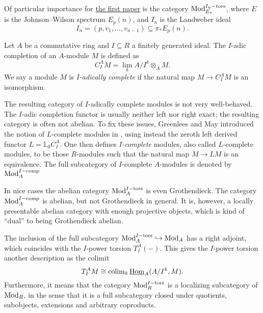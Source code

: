 \begin{example}
    Of particular importance for \hyperref[ch1]{the first paper} is the category $\mathrm{Mod}_{E_*}^{I_n-\mathrm{tors}}$, where $E$ is the Johnson--Wilson spectrum $E_p(n)$, and $I_n$ is the Landweber ideal 
    \[I_n = (p, v_1, \ldots, v_{n-1})\subseteq \pi_* E_p(n).\]
\end{example}

\begin{definition}
    Let $A$ be a commutative ring and $I\subseteq R$ a finitely generated ideal. The $I$-adic completion of an $A$-module $M$ is defined as
    \[C_I^A M = \lim_k A/I^k\otimes_A M.\]
    We say a module $M$ is \emph{$I$-adically complete} if the natural map $M\longrightarrow C_I^A M$ is an isomorphism. 
\end{definition}

\begin{remark}
    \label{ch0:rm:I-complete-vs-I-adically-complete}
    The resulting category of $I$-adically complete modules is not very well-behaved. The $I$-adic completion functor is usually neither left nor right exact; the resulting category is often not abelian. To fix these issues, Greenlees and May introduced the notion of $L$-complete modules in \cite{greenlees-may_92}, using instead the zeroth left derived functor $L=\mathbb{L}_0 C_I^A$. One then defines \emph{$I$-complete} modules, also called $L$-complete modules, to be those $R$-modules such that the natural map $M\longrightarrow L M$ is an equivalence. The full subcategory of $I$-complete $A$-modules is denoted by $\mathrm{Mod}_A^{I-\mathrm{comp}}$
\end{remark}

\begin{remark}
    In nice cases the abelian category $\mathrm{Mod}_A^{I-\mathrm{tors}}$ is even Grothendieck. The category $\mathrm{Mod}_A^{I-\mathrm{comp}}$ is abelian, but not Grothendieck in general. It is, however, a locally presentable abelian category with enough projective objects, which is kind of ``dual'' to being Grothendieck abelian. 
\end{remark}

\begin{remark}
    The inclusion of the full subcategory $\mathrm{Mod}_A^{I-\mathrm{tors}}\hookrightarrow \mathrm{Mod}_A$ has a right adjoint, which coincides with the $I$-power torsion $T_I^A(-)$. This gives the $I$-power torsion another description as the colimit 
    \[T_I^A M \cong \operatorname{colim}_k \operatorname{\underline{Hom}}_A (A/I^k, M).\]
    Furthermore, it means that the category $\mathrm{Mod}_R^{I-\mathrm{tors}}$ is a localizing subcategory of $\mathrm{Mod}_R$, in the sense that it is a full subcategory closed under quotients, subobjects, extensions and arbitrary coproducts. 
\end{remark}


